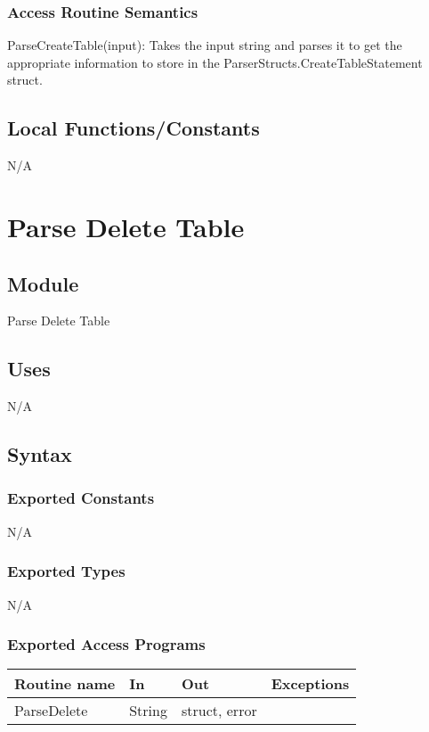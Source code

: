 \documentclass[12pt]{article}
\begin{document}
\subsubsection{Access Routine Semantics}
{\color{red} \noindent ParseCreateTable(input): Takes the input string and parses it to get the appropriate information to store in the ParserStructs.CreateTableStatement struct.\\}


\subsection{Local Functions/Constants}
N/A

\newpage

\section{Parse Delete Table}

\subsection{Module}
Parse Delete Table

\subsection{Uses}
N/A

\subsection{Syntax}
\subsubsection{Exported Constants}
N/A
\subsubsection{Exported Types}
N/A
\subsubsection{Exported Access Programs}
\begin{tabular}{| l | l | l | l |}
\hline
\textbf{Routine name} & \textbf{In} & \textbf{Out} & \textbf{Exceptions}\\
\hline
{\color{red}ParseDelete} & {\color{red}String} & {\color{red}struct, error} & \\
\hline
\end{tabular}
\end{document}
